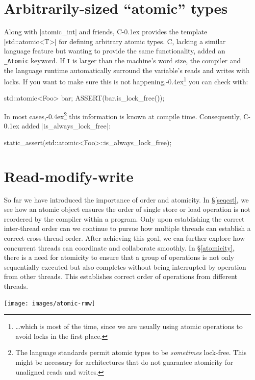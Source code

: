 \documentclass[fontsize=10pt, oneside]{scrartcl}
\newcommand{\punckern}{\kern-0.4ex}
\newcommand{\monobox}[1]{\mbox{\texttt{#1}}}
\newcommand{\keyword}[1]{\monobox{\color{darkGreen}#1}}
\newcommand{\cplusplus}[1]{C\kern-0.1ex\raisebox{0.15ex}{\texttt{++}}}
\newcommand{\clang}[1]{C}
\newcommand{\secref}[1]{\hyperref[#1]{\textsc{\S}\ref*{#1}}}
\begin{document}
\section{Arbitrarily-sized ``atomic'' types}
\label{atomictype}
Along with \cc|atomic_int| and friends,
\cplusplus{} provides the template \cpp|std::atomic<T>| for defining arbitrary atomic types.
\clang{}, lacking a similar language feature but wanting to provide the same functionality,
added an \keyword{\_Atomic} keyword.
If \texttt{T} is larger than the machine's word size,
the compiler and the language runtime automatically surround the variable's reads and writes with locks.
If you want to make sure this is not happening,\punckern\footnote{%
\ldots which is most of the time,
since we are usually using atomic operations to avoid locks in the first place.}
you can check with:
\begin{cppcode}
std::atomic<Foo> bar;
ASSERT(bar.is_lock_free());
\end{cppcode}
In most cases,\punckern\footnote{%
The language standards permit atomic types to be \emph{sometimes} lock-free.
This might be necessary for architectures that do not guarantee atomicity for unaligned reads and writes.}
this information is known at compile time.
Consequently, \cplusplus{17} added \cpp|is_always_lock_free|:
\begin{cppcode}
static_assert(std::atomic<Foo>::is_always_lock_free);
\end{cppcode}

\section{Read-modify-write}
\label{rmw}

So far we have introduced the importance of order and atomicity.
In \secref{seqcst}, we see how an atomic object ensures the order of single store or load operation is not reordered by the compiler within a program. 
Only upon establishing the correct inter-thread order can we continue to pursue how multiple threads can establish a correct cross-thread order. 
After achieving this goal, we can further explore how concurrent threads can coordinate and collaborate smoothly.
In \secref{atomicity}, there is a need for atomicity to ensure that a group of operations is not only sequentially executed but also completes without being interrupted by operation from other threads.
This establishes correct order of operations from different threads.

\texttt{[image: images/atomic-rmw]}
\label{fig:atomic-rmw}
\end{document}
